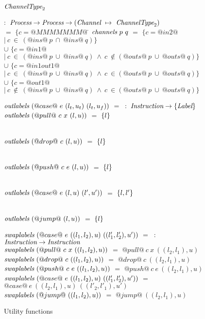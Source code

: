 \begin{figure*}

\begin{tabbing}
$\textit{ChannelType}_2$   \TABDEF \kill

 \> $:$ \> $\textit{Process} \to \textit{Process} \to (\textit{Channel} ~\mapsto~ \textit{ChannelType}_2)$ \\

  \> $=$    \> $\{ c=@MMMMMMM@~$\= \kill
$\textit{channels}~p~q$
  \> $=$    \> $\{ c=@in2@$
            \> $|~c~\in~(@ins@~p~\cap~@ins@~q) \}$ 
            \\

  \> $\cup$ \> $\{ c=@in1@$
            \> $ |~c~\in~(@ins@~p~\cup~@ins@~q)~\wedge~c~\not\in(@outs@~p~\cup~@outs@~q) \}$ \\

  \> $\cup$ \> $\{ c=@in1out1@$
            \> $|~c~\in~(@ins@~p~\cup~@ins@~q)~\wedge~c~\in(@outs@~p~\cup~@outs@~q) \}$ \\

  \> $\cup$ \> $\{ c=@out1@$
            \> $ |~c~\not\in~(@ins@~p~\cup~@ins@~q)~\wedge~c~\in(@outs@~p~\cup~@outs@~q) \}$ 
\end{tabbing}

\newcommand\funClauseDef[3]
{ $\ti{#1}~(#2)$ \> $=$ \> $#3$
}
\newcommand\outlabelsDef[2]
{ \funClauseDef{outlabels}{#1}{\sgl{#2}} 
}

\vspace{1ex}
\begin{tabbing}
$\textit{outlabels}~(@case@~e~(l_t,u_t)~(l_t,u_f))$ \TABSKIP $=$ \TABSKIP \kill
{} \> $~:$ \> $\textit{Instruction} \to \{ \textit{Label} \}$ \\
\outlabelsDef{@pull@~c~x~(l,u)}{l}              \\
\outlabelsDef{@drop@~c~(l,u)}{l}                \\
\outlabelsDef{@push@~c~e~(l,u)}{l}              \\
\outlabelsDef{@case@~e~(l,u)~(l',u')}{l, l'}    \\
\outlabelsDef{@jump@~(l,u)}{l}
\end{tabbing}

\vspace{1ex}
\begin{tabbing}
$\textit{swaplabels}~(@case@~e~((l_1,l_2),u)~((l'_1,l'_2),u'))$ \TABSKIP $=$ \TABSKIP \kill
{} \> $~:$ \> $\textit{Instruction} \to \textit{Instruction}$ \\
\funClauseDef{swaplabels}
  {@pull@~c~x~((l_1,l_2),u)}
  {@pull@~c~x~((l_2,l_1),u)}    \\
\funClauseDef{swaplabels}
  {@drop@~c~((l_1,l_2),u)}
  {@drop@~c~((l_2,l_1),u)}      \\
\funClauseDef{swaplabels}
  {@push@~c~e~((l_1,l_2),u)}
  {@push@~c~e~((l_2,l_1),u)}    \\
\funClauseDef{swaplabels}
  {@case@~e~((l_1,l_2),u)~((l'_1,l'_2),u')}
  {@case@~e~((l_2,l_1),u)~((l'_2,l'_1),u')}     \\
\funClauseDef{swaplabels}
  {@jump@~((l_1,l_2),u)}
  {@jump@~((l_2,l_1),u)}
\end{tabbing}

\caption{Utility functions}
\label{fig:Fusion:Utils}
\end{figure*}

